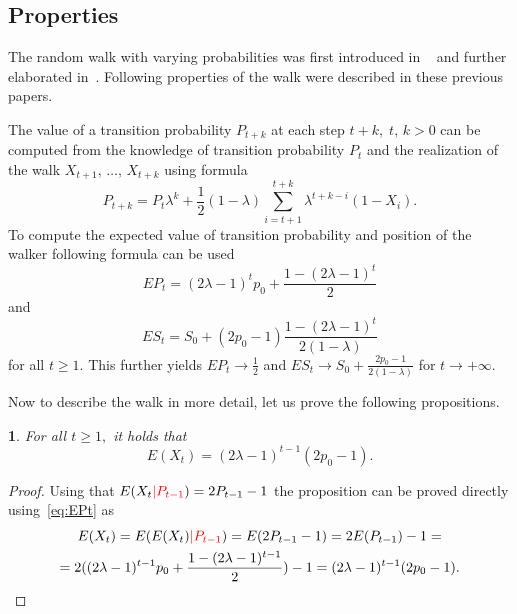 \documentclass{amsart}
\theoremstyle{definition}
\theoremstyle{plain}
\newtheorem{prop}[thm]{\protect\propositionname}
\theoremstyle{plain}
\theoremstyle{plain}
\numberwithin{equation}{section}
\providecommand{\propositionname}{Proposition}
\begin{document}
    \subsection{Properties}\label{subsec:properties}

    The random walk with varying probabilities was first introduced in
    ~\cite{ja2017ddny} and further elaborated in~\cite{ja2019teze}.
    Following properties of the walk were described in these previous
    papers.

    The value of a transition probability $P_{t+k}$ at
    each step $t+k,\;t,\,k>0$ can be computed from the knowledge of
    transition probability $P_{t}$ and the realization of the walk
    $X_{t+1},\,\dots,\,X_{t+k}$ using formula
    \begin{equation}
        P_{t+k}=P_{t}\lambda^{k}+\frac{1}{2}(1-\lambda)\sum_{i=t+1}^{t+k}\lambda^{t+k-i}(1-X_{i}).\label{eq:Pt}
    \end{equation}
    To compute the expected value of transition probability and position of the walker following formula can be used
    \begin{equation}
        EP_{t}=(2\lambda-1)^{t}p_{0}+\frac{1-(2\lambda-1)^{t}}{2}\label{eq:EPt}
    \end{equation}
    and
    \begin{equation}
        ES_{t}=S_{0}+(2p_{0}-1)\frac{1-(2\lambda-1)^{t}}{2(1-\lambda)}\label{eq:ESt}
    \end{equation}
    for all $t\geq1$.
    This further yields $EP_{t}\rightarrow\frac{1}{2}$
    and $ES_{t}\rightarrow S_{0}+\frac{2p_{0}-1}{2(1-\lambda)}$ for $t\rightarrow+\infty$.

    Now to describe the walk in more detail, let us
    prove the following propositions.

    \begin{prop}
        \label{PropEXt-succes}
        For all $t\geq1,$ it holds that
        \begin{equation}
            E(X_{t})=(2\lambda-1)^{t-1}(2p_{0}-1).
        \end{equation}
    \end{prop}
    \begin{proof}
        Using that $E(X_{t}{\color{red}|P_{t-1}})=2P_{t-1}-1$ the proposition can be
        proved directly using~\eqref{eq:EPt} as
        \begin{gather*}
            E(X_{t})=E(E(X_{t}){\color{red}|P_{t-1}})=E(2P_{t-1}-1)=2E(P_{t-1})-1=\\
            =2((2\lambda-1)^{t-1}p_{0}+\frac{1-(2\lambda-1)^{t-1}}{2})-1=(2\lambda-1)^{t-1}(2p_{0}-1).\\
        \end{gather*}
    \end{proof}
\end{document}
